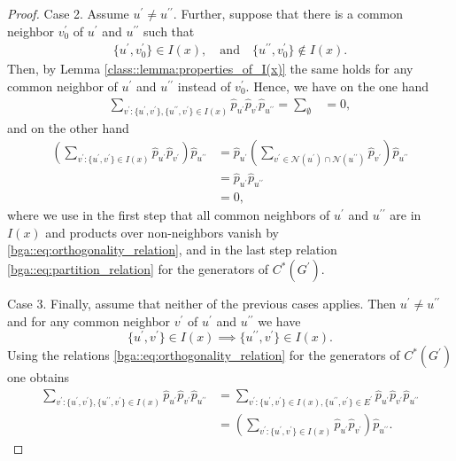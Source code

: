 \documentclass[a4paper]{amsart}
\begin{document}
\begin{proof}
    Case 2. Assume $u^\prime \neq u^{\prime\prime}$. Further, suppose that there is a common neighbor $v_0^\prime$ of $u^\prime$ and $u^{\prime\prime}$ such that 
    \begin{align*}
        \{u^\prime, v_0^\prime\} \in I(x),
        \quad \text{and} \quad 
        \{u^{\prime\prime}, v_0^\prime\} \not \in I(x).
    \end{align*}
    Then, by Lemma \ref{class::lemma:properties_of_I(x)} the same holds for any common neighbor of $u^\prime$ and $u^{\prime\prime}$ instead of $v_0^\prime$. Hence, we have on the one hand
    \begin{align*}
        \sum_{v^\prime: \{u^\prime, v^\prime\}, \{u^{\prime\prime}, v^{\prime}\} \in I(x)} \hat{p}_{u^\prime} \hat{p}_{v^\prime} \hat{p}_{u^{\prime\prime}}
        = \sum_{\emptyset} &= 0,
    \end{align*}
    and on the other hand
    \begin{align*}
         \left( \sum_{v^\prime: \{u^\prime, v^\prime\} \in I(x)} \hat{p}_{u^\prime} \hat{p}_{v^\prime} \right) \hat{p}_{u^{\prime\prime}}
         &= \hat{p}_{u^\prime} \left( \sum_{v^\prime \in \mathcal{N}(u^\prime) \cap \mathcal{N}(u^{\prime\prime})} \hat{p}_{v^\prime} \right) \hat{p}_{u^{\prime\prime}} \\
         &= \hat{p}_{u^\prime} \hat{p}_{u^{\prime\prime}} \\
         &= 0,
    \end{align*}
    where we use in the first step that all common neighbors of $u^\prime$ and $u^{\prime\prime}$ are in $I(x)$ and products over non-neighbors vanish by \eqref{bga::eq:orthogonality_relation}, and in the last step relation \eqref{bga::eq:partition_relation} for the generators of $C^\ast(G^\prime)$.

    Case 3. Finally, assume that neither of the previous cases applies. %
    Then $u^\prime \neq u^{\prime\prime}$ and for any common neighbor $v^\prime$ of $u^\prime$ and $u^{\prime\prime}$ we have 
    $$
        \{u^\prime, v^\prime\} \in I(x) \implies \{u^{\prime\prime}, v^\prime\} \in I(x).
    $$
    Using the relations \eqref{bga::eq:orthogonality_relation} for the generators of $C^\ast(G^\prime)$ one obtains 
    \begin{align*}
        \sum_{v^\prime: \{u^\prime, v^\prime\}, \{u^{\prime\prime}, v^{\prime}\} \in I(x)} \hat{p}_{u^\prime} \hat{p}_{v^\prime} \hat{p}_{u^{\prime\prime}}
        &= \sum_{v^\prime: \{u^\prime, v^\prime\} \in I(x), \{u^{\prime\prime}, v^{\prime}\} \in E^\prime} \hat{p}_{u^\prime} \hat{p}_{v^\prime} \hat{p}_{u^{\prime\prime}} \\
        &= \left( \sum_{v^\prime: \{u^\prime, v^\prime\} \in I(x)} \hat{p}_{u^\prime} \hat{p}_{v^\prime} \right) \hat{p}_{u^{\prime\prime}}.
    \end{align*}
    

\end{proof}
\end{document}
